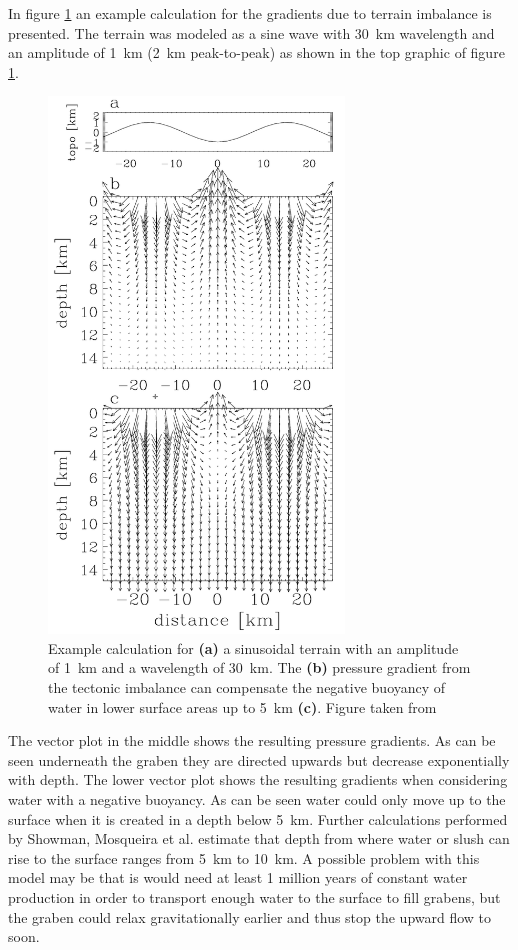 In figure \ref{fig:gradients} an example calculation for the gradients
due to terrain imbalance is presented. The terrain was modeled as
a sine wave with 30~km wavelength and an amplitude of 1~km (2~km
peak-to-peak) as shown in the top graphic of figure \ref{fig:gradients}.
\begin{figure}
\begin{centering}
\includegraphics[width=0.7\textwidth]{Figures/gradients}
\par\end{centering}

\caption{Example calculation for \textbf{(a)} a sinusoidal terrain with an
amplitude of 1~km and a wavelength of 30~km. The \textbf{(b)} pressure
gradient from the tectonic imbalance can compensate the negative buoyancy
of water in lower surface areas up to 5~km \textbf{(c)}. Figure taken
from \cite{Showman2004}\label{fig:gradients}}


\end{figure}
 The vector plot in the middle shows the resulting pressure gradients.
As can be seen underneath the graben they are directed upwards but
decrease exponentially with depth. The lower vector plot shows the
resulting gradients when considering water with a negative buoyancy.
As can be seen water could only move up to the surface when it is
created in a depth below 5~km. Further calculations performed by
Showman, Mosqueira et al. estimate that depth from where water or
slush can rise to the surface ranges from 5~km to 10~km. A possible
problem with this model may be that is would need at least 1 million
years of constant water production in order to transport enough water
to the surface to fill grabens, but the graben could relax gravitationally
earlier and thus stop the upward flow to soon\cite{Showman2004}. 

